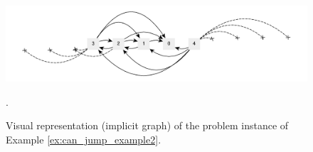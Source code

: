 \begin{figure}
	\centering
	\includegraphics[width=\textwidth]{sources/can_jump/images/example2}
	\caption[Implicit graph for the Example \ref{ex:can_jump_example2}.]
	{Visual representation (implicit graph) of the problem instance of Example
	\ref{ex:can_jump_example2}.}.
	\label{fig:can_jump:example2}
\end{figure}


	

